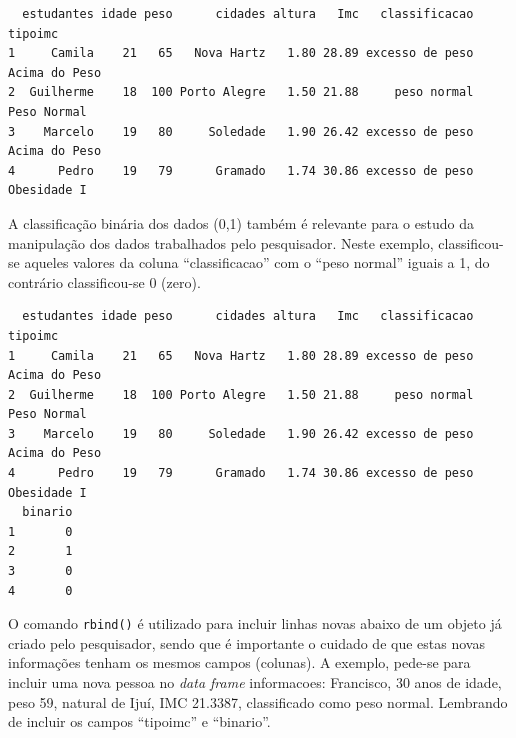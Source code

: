 \documentclass[12pt,brazil,oneside]{book}
\newenvironment{Shaded}{\begin{snugshade}}{\end{snugshade}}
\newcommand{\CommentTok}[1]{\textcolor[rgb]{0.56,0.35,0.01}{\textit{#1}}}
\newcommand{\DecValTok}[1]{\textcolor[rgb]{0.00,0.00,0.81}{#1}}
\newcommand{\KeywordTok}[1]{\textcolor[rgb]{0.13,0.29,0.53}{\textbf{#1}}}
\newcommand{\NormalTok}[1]{#1}
\newcommand{\OperatorTok}[1]{\textcolor[rgb]{0.81,0.36,0.00}{\textbf{#1}}}
\newcommand{\StringTok}[1]{\textcolor[rgb]{0.31,0.60,0.02}{#1}}
\begin{document}
\begin{verbatim}
  estudantes idade peso      cidades altura   Imc   classificacao       tipoimc
1     Camila    21   65   Nova Hartz   1.80 28.89 excesso de peso Acima do Peso
2  Guilherme    18  100 Porto Alegre   1.50 21.88     peso normal   Peso Normal
3    Marcelo    19   80     Soledade   1.90 26.42 excesso de peso Acima do Peso
4      Pedro    19   79      Gramado   1.74 30.86 excesso de peso   Obesidade I
\end{verbatim}

A classificação binária dos dados (0,1) também é relevante para o estudo
da manipulação dos dados trabalhados pelo pesquisador. Neste exemplo,
classificou-se aqueles valores da coluna ``classificacao'' com o ``peso
normal'' iguais a 1, do contrário classificou-se 0 (zero).

\begin{Shaded}
\end{Shaded}

\begin{verbatim}
  estudantes idade peso      cidades altura   Imc   classificacao       tipoimc
1     Camila    21   65   Nova Hartz   1.80 28.89 excesso de peso Acima do Peso
2  Guilherme    18  100 Porto Alegre   1.50 21.88     peso normal   Peso Normal
3    Marcelo    19   80     Soledade   1.90 26.42 excesso de peso Acima do Peso
4      Pedro    19   79      Gramado   1.74 30.86 excesso de peso   Obesidade I
  binario
1       0
2       1
3       0
4       0
\end{verbatim}

O comando \texttt{rbind()} é utilizado para incluir linhas novas abaixo
de um objeto já criado pelo pesquisador, sendo que é importante o
cuidado de que estas novas informações tenham os mesmos campos
(colunas). A exemplo, pede-se para incluir uma nova pessoa no \emph{data
frame} informacoes: Francisco, 30 anos de idade, peso 59, natural de
Ijuí, IMC 21.3387, classificado como peso normal. Lembrando de incluir
os campos ``tipoimc'' e ``binario''.
\end{document}
